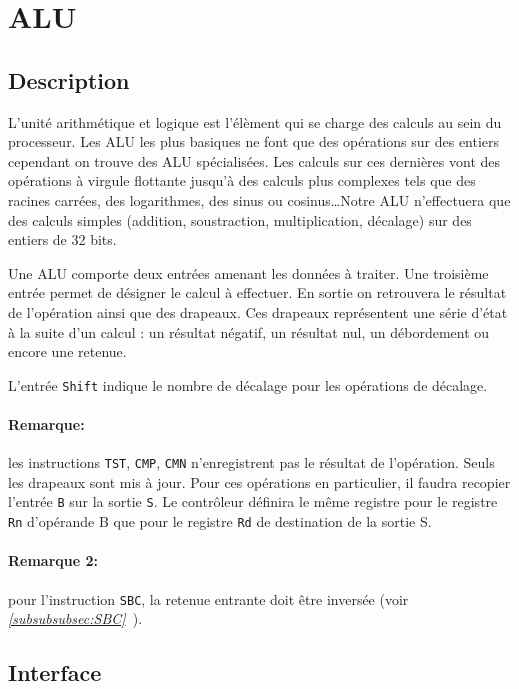 \documentclass{article}
\begin{document}
    \section{ALU}
    \label{sec:ALU}

    \subsection{Description}

    L'unité arithmétique et logique est l'élèment qui se charge des calculs au sein du processeur.
    Les ALU les plus basiques ne font que des opérations sur des entiers cependant on trouve des ALU spécialisées.
    Les calculs sur ces dernières vont des opérations à virgule flottante jusqu'à des calculs plus complexes tels
    que des racines carrées, des logarithmes, des sinus ou cosinus\ldots Notre ALU n'effectuera que des calculs simples
    (addition, soustraction, multiplication, décalage) sur des entiers de 32 bits.

    Une ALU comporte deux entrées amenant les données à traiter.
    Une troisième entrée permet de désigner le calcul à effectuer.
    En sortie on retrouvera le résultat de l'opération ainsi que des drapeaux.
    Ces drapeaux représentent une série d'état à la suite d'un calcul : un résultat négatif, un résultat nul, un
    débordement ou encore une retenue.

    L'entrée \texttt{Shift} indique le nombre de décalage pour les opérations de décalage.

    \paragraph{Remarque:} les instructions \texttt{TST}, \texttt{CMP}, \texttt{CMN} n'enregistrent pas le résultat de l'opération.
    Seuls les drapeaux sont mis à jour.
    Pour ces opérations en particulier, il faudra recopier l'entrée \texttt{B} sur la sortie \texttt{S}.
    Le contrôleur définira le même registre pour le registre \texttt{Rn} d'opérande B que pour le registre \texttt{Rd}
    de destination de la sortie S.

    \paragraph{Remarque 2:} pour l'instruction \texttt{SBC}, la retenue entrante doit être inversée
    (voir \textit{\ref{subsubsubsec:SBC}~}).

    \subsection{Interface}
\end{document}
